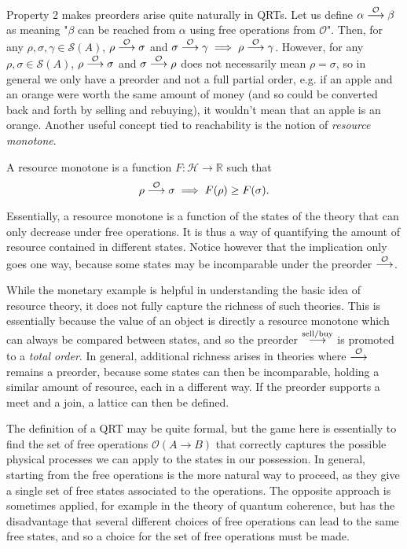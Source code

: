 Property 2 makes preorders arise quite naturally in QRTs. Let us define $\alpha \overset{\mathcal{O}}{\longrightarrow} \beta$ as meaning "$\beta$ can be reached from $\alpha$ using free operations from $\mathcal{O}$". Then, for any $\rho, \sigma, \gamma \in \mathcal{S}(A)$, $\rho \overset{\mathcal{O}}{\longrightarrow} \sigma$ and $\sigma \overset{\mathcal{O}}{\longrightarrow} \gamma \implies \rho \overset{\mathcal{O}}{\longrightarrow} \gamma$. However, for any $\rho, \sigma \in \mathcal{S}(A)$, $\rho \overset{\mathcal{O}}{\longrightarrow} \sigma$ and $\sigma \overset{\mathcal{O}}{\longrightarrow} \rho$ does not necessarily mean $\rho = \sigma$, so in general we only have a preorder and not a full partial order, e.g. if an apple and an orange were worth the same amount of money (and so could be converted back and forth by selling and rebuying), it wouldn't mean that an apple is an orange. Another useful concept tied to reachability is the notion of \textit{resource monotone}.

\begin{definition}
    A resource monotone is a function $F: \mathcal{H} \rightarrow \mathbb{R}$ such that
    \begin{equation}
        \rho \overset{\mathcal{O}}{\longrightarrow} \sigma \implies F(\rho) \geq F(\sigma).
    \end{equation}
\end{definition}

Essentially, a resource monotone is a function of the states of the theory that can only decrease under free operations. It is thus a way of quantifying the amount of resource contained in different states. Notice however that the implication only goes one way, because some states may be incomparable under the preorder $\overset{\mathcal{O}}{\longrightarrow}$.

\begin{remark}
    While the monetary example is helpful in understanding the basic idea of resource theory, it does not fully capture the richness of such theories. This is essentially because the value of an object is directly a resource monotone which can always be compared between states, and so the preorder $\overset{\text{sell/buy}}{\longrightarrow}$ is promoted to a \textit{total order}. In general, additional richness arises in theories where $\overset{\mathcal{O}}{\longrightarrow}$ remains a preorder, because some states can then be incomparable, holding a similar amount of resource, each in a different way. If the preorder supports a meet and a join, a lattice can then be defined. 
\end{remark}

The definition of a QRT may be quite formal, but the game here is essentially to find the set of free operations $\mathcal{O}(A \rightarrow B)$ that correctly captures the possible physical processes we can apply to the states in our possession. In general, starting from the free operations is the more natural way to proceed, as they give a single set of free states associated to the operations. The opposite approach is sometimes applied, for example in the theory of quantum coherence, but has the disadvantage that several different choices of free operations can lead to the same free states, and so a choice for the set of free operations must be made.


